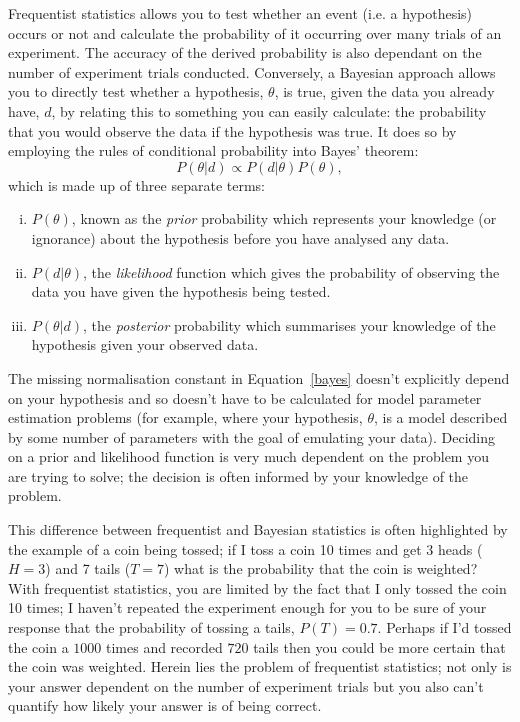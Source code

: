 Frequentist statistics allows you to test whether an event (i.e. a hypothesis) occurs or not and calculate the probability of it occurring over many trials of an experiment. The accuracy of the derived probability is also dependant on the number of experiment trials conducted. Conversely, a Bayesian approach allows you to directly test whether a hypothesis, $\theta$, is true, given the data you already have, $d$, by relating this to something you can easily calculate: the probability that you would observe the data if the hypothesis was true. It does so by employing the rules of conditional probability into Bayes' theorem:
\begin{equation}\label{bayes}
P(\theta|d) \propto P(d | \theta)P(\theta),
\end{equation}
which is made up of three separate terms: 
\begin{enumerate}[(i)]
\item $P(\theta)$, known as the \emph{prior} probability which represents your knowledge (or ignorance) about the hypothesis before you have analysed any data. 
\item $P(d  | \theta)$, the \emph{likelihood} function which gives the probability of observing the data you have given the hypothesis being tested. 
\item $P(\theta | d)$, the \emph{posterior} probability which summarises your knowledge of the hypothesis given your observed data.
\end{enumerate}
The missing normalisation constant in Equation~\ref{bayes} doesn't explicitly depend on your hypothesis and so doesn't have to be calculated for model parameter estimation problems (for example, where your hypothesis, $\theta$, is a model described by some number of parameters with the goal of emulating your data). Deciding on a prior and likelihood function is very much dependent on the problem you are trying to solve; the decision is often informed by your knowledge of the problem. 

This difference between frequentist and Bayesian statistics is often highlighted by the example of a coin being tossed; if I toss a coin 10 times and get 3 heads ($H=3$) and 7 tails ($T=7$) what is the probability that the coin is weighted? With frequentist statistics, you are limited by the fact that I only tossed the coin 10 times; I haven't repeated the experiment enough for you to be sure of your response that the probability of tossing a tails,  $P(T)=0.7$. Perhaps if I'd tossed the coin a $1000$ times and recorded $720$ tails then you could be more certain that the coin was weighted. Herein lies the problem of frequentist statistics; not only is your answer dependent on the number of experiment trials but you also can't quantify how likely your answer is of being correct. 

